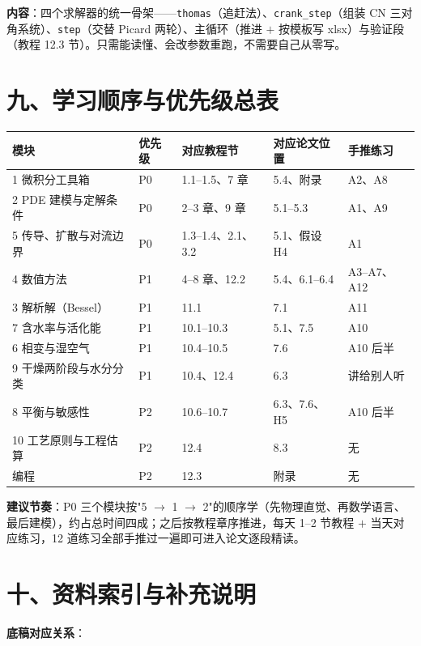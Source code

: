\documentclass[12pt,a4paper]{ctexart}
\begin{document}
\textbf{内容}：四个求解器的统一骨架——\texttt{thomas}（追赶法）、\texttt{crank\_step}（组装 CN 三对角系统）、\texttt{step}（交替 Picard 两轮）、主循环（推进 $+$ 按模板写 xlsx）与验证段（教程 12.3 节）。只需能读懂、会改参数重跑，不需要自己从零写。

\section{九、学习顺序与优先级总表}

\begin{center}
{\begin{tabular}{p{3.4cm}p{1.1cm}p{4.2cm}p{2.6cm}p{3.4cm}}
\toprule
模块 & 优先级 & 对应教程节 & 对应论文位置 & 手推练习 \\
\midrule
1 微积分工具箱 & P0 & 1.1--1.5、7 章 & 5.4、附录 & A2、A8 \\
2 PDE 建模与定解条件 & P0 & 2--3 章、9 章 & 5.1--5.3 & A1、A9 \\
5 传导、扩散与对流边界 & P0 & 1.3--1.4、2.1、3.2 & 5.1、假设 H4 & A1 \\
4 数值方法 & P1 & 4--8 章、12.2 & 5.4、6.1--6.4 & A3--A7、A12 \\
3 解析解（Bessel） & P1 & 11.1 & 7.1 & A11 \\
7 含水率与活化能 & P1 & 10.1--10.3 & 5.1、7.5 & A10 \\
6 相变与湿空气 & P1 & 10.4--10.5 & 7.6 & A10 后半 \\
9 干燥两阶段与水分分类 & P1 & 10.4、12.4 & 6.3 & 讲给别人听 \\
8 平衡与敏感性 & P2 & 10.6--10.7 & 6.3、7.6、H5 & A10 后半 \\
10 工艺原则与工程估算 & P2 & 12.4 & 8.3 & 无 \\
编程 & P2 & 12.3 & 附录 & 无 \\
\bottomrule
\end{tabular}}
\end{center}

\textbf{建议节奏}：P0 三个模块按"5 $\to$ 1 $\to$ 2"的顺序学（先物理直觉、再数学语言、最后建模），约占总时间四成；之后按教程章序推进，每天 1--2 节教程 $+$ 当天对应练习，12 道练习全部手推过一遍即可进入论文逐段精读。

\section{十、资料索引与补充说明}

\textbf{底稿对应关系}：
\end{document}
